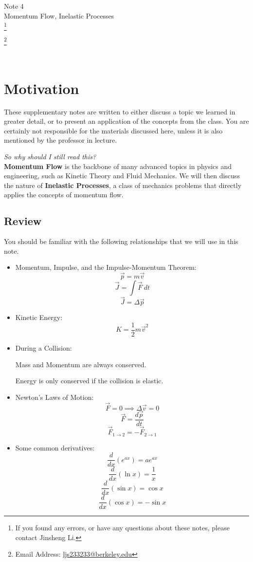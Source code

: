 \documentclass[11pt]{article}
\newcommand\blfootnote[1]{
    \begingroup
    \renewcommand\thefootnote{}\footnote{#1}
    \addtocounter{footnote}{-1}
    \endgroup
}
\theoremstyle{gangnamstyle}{\newtheorem{definition}{Definition}[]}
\theoremstyle{gangnamstyle}{\newtheorem{example}{Example}[]}
\theoremstyle{gangnamstyle}{\newtheorem{problem}{Problem}[]}
\theoremstyle{gangnamstyle}{\newtheorem{warning}{Warning}[]}
\begin{document}
\normalfont
\pagestyle{pages}


\begin{center}
\vspace{3in}
{\Large Note 4} \\[0.05in]
Momentum Flow, Inelastic Processes \\ 
\blfootnote{If you found any errors, or have any questions about these notes, please contact Jinsheng Li.} \blfootnote{Email Address: \href{mailto:ljs233233@berkeley.edu}{ljs233233@berkeley.edu}} \\ [-0.5in]
\end{center}

\section*{Motivation}

These supplementary notes are written to either discuss a topic we learned in greater detail, or to present an application of the concepts from the class. You are certainly not responsible for the materials discussed here, unless it is also mentioned by the professor in lecture. 

\textit{So why should I still read this?} \\
\textbf{Momentum Flow} is the backbone of many advanced topics in physics and engineering, such as Kinetic Theory and Fluid Mechanics. We will then discuss the nature of \textbf{Inelastic Processes}, a class of mechanics problems that directly applies the concepts of momentum flow.  

\subsection*{Review}

You should be familiar with the following relationships that we will use in this note. 

\begin{itemize}
\item Momentum, Impulse, and the Impulse-Momentum Theorem: 
\[ \Vec{p} = m\Vec{v} \]
\[ \Vec{J} = \int \Vec{F} \ dt \]
\[ \Vec{J} = \Delta \Vec{p} \]

\item Kinetic Energy:
\[ K = \frac{1}{2}m\Vec{v}^2 \]

\item During a Collision: 

Mass and Momentum are always conserved. 

Energy is only conserved if the collision is elastic. \\

\item Newton's Laws of Motion: 
\[ \Vec{F} = 0 \implies \Delta \Vec{v} = 0 \]
\[ \Vec{F} = \frac{d\Vec{p}}{dt} \]
\[ \Vec{F}_{1\rightarrow2} = -\Vec{F}_{2\rightarrow1} \]

\item Some common derivatives: 
\[ \frac{d}{dx}(e^{ax}) = ae^{ax} \]
\[ \frac{d}{dx}(\ln x) = \frac{1}{x} \]
\[ \frac{d}{dx}(\sin x) = \cos x \]
\[ \frac{d}{dx}(\cos x) = -\sin x \]
\end{itemize}
\pagebreak
\end{document}
